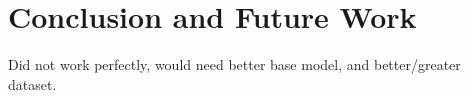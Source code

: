 \documentclass[../main.tex]{subfiles}
\begin{document}
\section{Conclusion and Future Work}

Did not work perfectly, would need better base model, and better/greater dataset.
\end{document}
